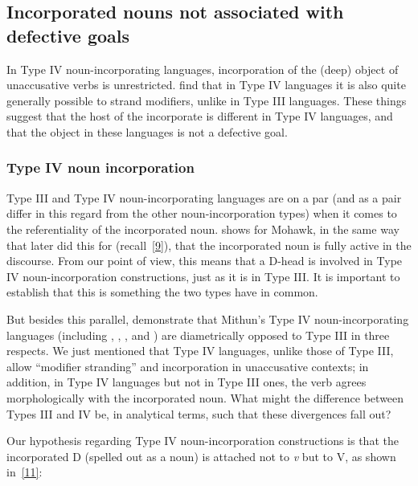 \documentclass[output=paper]{langsci/langscibook}
\begin{document}
\begin{refcontext}
\subsection{Incorporated nouns not associated with defective goals}
\label{sec:16.2.3}
In Type IV noun-incorporating languages, incorporation of the (deep) object of
unaccusative verbs is unrestricted. \citet{bakeretal05} find that in Type IV
languages it is also quite generally possible to strand modifiers, unlike in
Type III languages. These things suggest that the host of the incorporate is
different in Type IV languages, and that the object in these languages is not a
defective goal.

\subsubsection{Type IV noun incorporation}
Type III and Type IV noun-incorporating languages are on a par (and as a pair
differ in this regard from the other noun-incorporation types) when it comes to
the referentiality of the incorporated noun. \citet[287--288 and sect.
7.4.3]{baker96} shows for Mohawk, in the same way that  \citet{bakeretal05}
later did this for  (recall~\eqref{9}), that the incorporated noun is
fully active in the discourse.  From our point of view, this means that a
D-head is involved in Type IV noun-incorporation constructions, just as it is
in Type III. It is important to establish that this is something the two types
have in common.

But besides this parallel, \citet{bakeretal05} demonstrate that Mithun’s Type IV
noun-incorporating languages (including , ,
, and ) are diametrically opposed to Type III in three respects. We just
mentioned that Type IV languages, unlike those of Type III, allow \enquote{modifier
stranding} and incorporation in unaccusative contexts; in addition, in Type IV
languages but not in Type III ones, the verb agrees morphologically with the
incorporated noun.  What might the difference between Types III and IV be, in
analytical terms, such that these divergences fall out?

Our hypothesis regarding Type IV noun-incorporation constructions is that the
incorporated D (spelled out as a noun) is attached not to \emph{v} but to V,
as shown in~\eqref{11}:


\end{refcontext}
\end{document}
